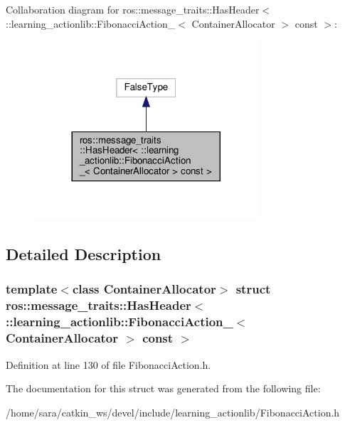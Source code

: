 Collaboration diagram for ros\+:\+:message\+\_\+traits\+:\+:Has\+Header$<$ \+:\+:learning\+\_\+actionlib\+:\+:Fibonacci\+Action\+\_\+$<$ Container\+Allocator $>$ const $>$\+:
\nopagebreak
\begin{figure}[H]
\begin{center}
\leavevmode
\includegraphics[width=236pt]{structros_1_1message__traits_1_1HasHeader_3_01_1_1learning__actionlib_1_1FibonacciAction___3_01C1b21cea889be4ddfca48ede805aef29c}
\end{center}
\end{figure}


\subsection{Detailed Description}
\subsubsection*{template$<$class Container\+Allocator$>$\newline
struct ros\+::message\+\_\+traits\+::\+Has\+Header$<$ \+::learning\+\_\+actionlib\+::\+Fibonacci\+Action\+\_\+$<$ Container\+Allocator $>$ const $>$}



Definition at line 130 of file Fibonacci\+Action.\+h.



The documentation for this struct was generated from the following file\+:\begin{DoxyCompactItemize}
\item 
/home/sara/catkin\+\_\+ws/devel/include/learning\+\_\+actionlib/Fibonacci\+Action.\+h\end{DoxyCompactItemize}
